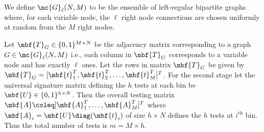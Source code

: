 \documentclass[conference,twocolumn]{IEEEtran}
\begin{document}
\begin{definition}
We define $\mc{G}_{\ell}(N,M)$ to be the ensemble of left-regular bipartite graphs where, for each variable node, the $\ell$ right node connections are chosen uniformly at random from the $M$ right nodes.
\end{definition}

Let $\mbf{T}_{G}\in\{0,1\}^{M\times N }$ be the adjacency matrix corresponding to a graph $G\in\mc{G}_{\ell}(N,M)$ i.e., each column in $\mbf{T}_{G}$ corresponds to a variable node and has exactly $\ell$ ones. Let the rows in matrix $\mbf{T}_{G}$ be given by $\mbf{T}_{G}=[\mbf{t}^{T}_1,\mbf{t}^{T}_{2},\dots, \mbf{t}^{T}_{M}]^{T}$. For the second stage let the universal signature matrix defining the $h$ tests at each bin be $\mbf{U}\in\{0,1\}^{h\times N}$. Then the overall testing matrix $\mbf{A}\coleq [\mbf{A}_{1}^{T},\ldots,\mbf{A}_{M}^{T}]^T$ where $\mbf{A}_{i}=\mbf{U} \diag (\mbf{t}_i)$ of size $h\times N$ defines the $h$ tests at $i^{\text{th}}$ bin. Thus the total number of tests is $m=M\times h$.

 
\end{document}
